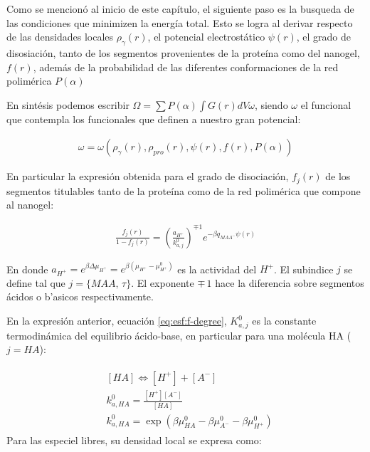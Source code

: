 Como se mencion\'o al inicio de este cap\'itulo, el siguiente paso es la busqueda de las condiciones que minimizen la energ\'ia total. Esto se logra al derivar respecto de las densidades locales $\rho_\gamma(r)$, el potencial electrost\'atico $\psi(r)$, el grado de disosiaci\'on, tanto de los segmentos provenientes de la prote\'ina como del nanogel, $f(r)$, adem\'as de la probabilidad de las diferentes conformaciones de la red polim\'erica $P(\alpha)$

En sint\'esis podemos escribir $\Omega = \sum P(\alpha) \int{G(r) dV\omega}$,  siendo $\omega$ el funcional que contempla los funcionales que definen a nuestro gran potencial: 

\begin{align}
	\omega=\omega(\rho_\gamma(r), \rho_{pro}(r),\psi(r),f(r),P(\alpha))
	\label{eq:esf:funcionales-omega}
\end{align}


En particular la expresi\'on obtenida para el grado de disociaci\'on, $f_j(r)$ de los segmentos titulables tanto de la prote\'ina como de la red polim\'erica que compone al nanogel:

\begin{align}
	\frac{f_j(r)}{1-f_j(r)}= \left(\frac{a_{H^+}}{k^0_{a,j}}\right)^{\mp 1} e^{-\beta q_{MAA^-}\psi(r)}
	\label{eq:esf:f-degree}
\end{align}

\noindent En donde  $a_{H^+}=e^{\beta\Delta\mu_{H^+}}=e^{\beta(\mu_{H^+} -\mu^0_{H^+})}$ es la actividad del $H^+$. El subindice  $j$ se define tal que  $j =\{MAA , \, \tau \}$. El exponente $\mp \, 1$ hace la diferencia sobre segmentos \'acidos o b'asicos respectivamente.

En la expresi\'on anterior, ecuaci\'on \ref{eq:esf:f-degree}, $K^0_{a,j}$ es la constante termodin\'amica del equilibrio \'acido-base, en particular para una mol\'ecula HA ($j= HA$): 

\begin{align}
	\begin{aligned}
		& \left[HA\right] \Longleftrightarrow [H^+] +[A^-] \\
		& k_{a,HA}^0=\frac{[H^+][A^-]}{[HA]} \\
		& k_{a,HA}^0=\exp\left(\beta\mu_{HA}^0 - \beta \mu_{A^-}^0 - \beta \mu^0_{H^+} \right)
	\end{aligned}
	\label{eq:esf:dis-rxn}
\end{align}
Para las especiel libres, su densidad local se expresa como:


